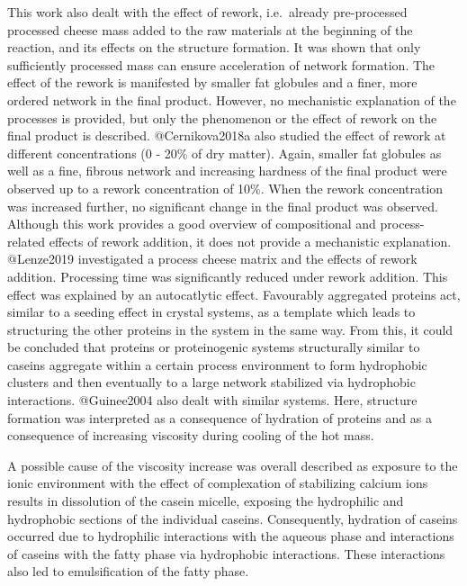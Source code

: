 \documentclass[
]{article}
\begin{document}
This work also dealt with the effect of rework, i.e.~already
pre-processed processed cheese mass added to the raw materials at the
beginning of the reaction, and its effects on the structure formation.
It was shown that only sufficiently processed mass can ensure
acceleration of network formation. The effect of the rework is
manifested by smaller fat globules and a finer, more ordered network in
the final product. However, no mechanistic explanation of the processes
is provided, but only the phenomenon or the effect of rework on the
final product is described. @Cernikova2018a also studied the effect of
rework at different concentrations (0 - 20\% of dry matter). Again,
smaller fat globules as well as a fine, fibrous network and increasing
hardness of the final product were observed up to a rework concentration
of 10\%. When the rework concentration was increased further, no
significant change in the final product was observed. Although this work
provides a good overview of compositional and process-related effects of
rework addition, it does not provide a mechanistic explanation.
@Lenze2019 investigated a process cheese matrix and the effects of
rework addition. Processing time was significantly reduced under rework
addition. This effect was explained by an autocatlytic effect.
Favourably aggregated proteins act, similar to a seeding effect in
crystal systems, as a template which leads to structuring the other
proteins in the system in the same way. From this, it could be concluded
that proteins or proteinogenic systems structurally similar to caseins
aggregate within a certain process environment to form hydrophobic
clusters and then eventually to a large network stabilized via
hydrophobic interactions. @Guinee2004 also dealt with similar systems.
Here, structure formation was interpreted as a consequence of hydration
of proteins and as a consequence of increasing viscosity during cooling
of the hot mass.

A possible cause of the viscosity increase was overall described as
exposure to the ionic environment with the effect of complexation of
stabilizing calcium ions results in dissolution of the casein micelle,
exposing the hydrophilic and hydrophobic sections of the individual
caseins. Consequently, hydration of caseins occurred due to hydrophilic
interactions with the aqueous phase and interactions of caseins with the
fatty phase via hydrophobic interactions. These interactions also led to
emulsification of the fatty phase.
\end{document}
